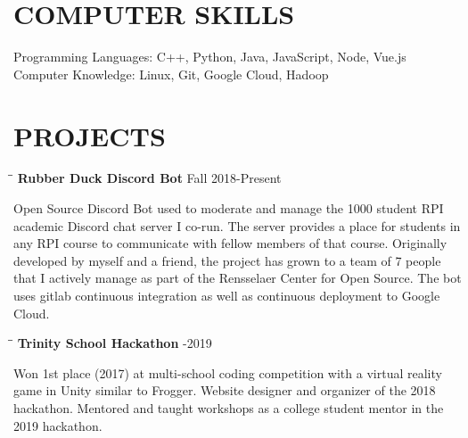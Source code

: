 \documentclass{res}
\begin{document}
\begin{resume}
\section{COMPUTER SKILLS}          
    Programming Languages: C++, Python, Java, JavaScript, Node, Vue.js\\
    Computer Knowledge: Linux, Git, Google Cloud, Hadoop       
 
 
\section{PROJECTS} 
	\vspace{-0.1in}	         
	\begin{tabbing}
   \hspace{2.3in}\= \hspace{3.6in}\= \kill
    {\bf Rubber Duck Discord Bot} \>  \>Fall 2018-Present
   \end{tabbing}\vspace{-20pt} 
	Open Source Discord Bot used to moderate and manage the 1000 student RPI academic Discord chat server I co-run. The server provides a place for students in any RPI course to communicate with fellow members of that course. Originally developed by myself and a friend, the project has grown to a team of 7 people that I actively manage as part of the Rensselaer Center for Open Source. The bot uses gitlab continuous integration as well as continuous deployment to Google Cloud.
	\vspace{-15pt} 	         
	\begin{tabbing}
   \hspace{2.3in}\= \hspace{4in}\= \kill
    {\bf Trinity School Hackathon} \>  -2019
   \end{tabbing}\vspace{-20pt} 
	Won 1st place (2017) at multi-school coding competition with a virtual reality game in Unity similar to Frogger. Website designer and organizer of the 2018 hackathon. Mentored and taught workshops as a college student mentor in the 2019 hackathon.
    
          
 
\end{resume}
\end{document}
